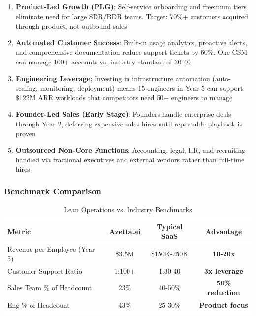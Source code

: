 \begin{enumerate}[noitemsep]
    \item \textbf{Product-Led Growth (PLG)}: Self-service onboarding and freemium tiers eliminate need for large SDR/BDR teams. Target: 70\%+ customers acquired through product, not outbound sales
    
    \item \textbf{Automated Customer Success}: Built-in usage analytics, proactive alerts, and comprehensive documentation reduce support tickets by 60\%. One CSM can manage 100+ accounts vs. industry standard of 30-40
    
    \item \textbf{Engineering Leverage}: Investing in infrastructure automation (auto-scaling, monitoring, deployment) means 15 engineers in Year 5 can support \$122M ARR workloads that competitors need 50+ engineers to manage
    
    \item \textbf{Founder-Led Sales (Early Stage)}: Founders handle enterprise deals through Year 2, deferring expensive sales hires until repeatable playbook is proven
    
    \item \textbf{Outsourced Non-Core Functions}: Accounting, legal, HR, and recruiting handled via fractional executives and external vendors rather than full-time hires
\end{enumerate}

\subsubsection{Benchmark Comparison}

\begin{table}[ht]
\centering
\small
\begin{tabular}{|l|c|c|c|}
\hline
\textbf{Metric} & \textbf{Azetta.ai} & \textbf{Typical SaaS} & \textbf{Advantage} \\
\hline
Revenue per Employee (Year 5) & \$3.5M & \$150K-250K & \textbf{10-20x} \\
Customer Support Ratio & 1:100+ & 1:30-40 & \textbf{3x leverage} \\
Sales Team \% of Headcount & 23\% & 40-50\% & \textbf{50\% reduction} \\
Eng \% of Headcount & 43\% & 25-30\% & \textbf{Product focus} \\
\hline
\end{tabular}
\caption{Lean Operations vs. Industry Benchmarks}
\end{table}

